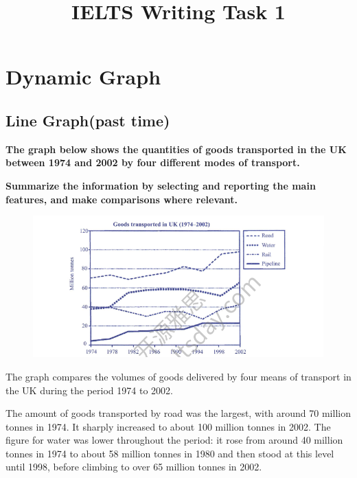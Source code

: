 \documentclass[conference]{IEEEtran}
\begin{document}
\title{IELTS Writing Task 1\\}

\author{}

\maketitle

\section{Dynamic Graph}

\subsection{Line Graph(past time)}

\textbf{The graph below shows the quantities of goods transported in the UK between 1974 and 2002 by four different modes of transport.}

\textbf{Summarize the information by selecting and reporting the main features, and make comparisons where relevant.}

\begin{figure}[htbp]
    \centerline{\includegraphics[width=1.4\columnwidth]{images/Screenshot from 2022-12-03 15-25-38.png}}
\end{figure}

The graph compares the volumes of goods delivered by four means of transport in the UK during the period 1974 to 2002.

The amount of goods transported by road was the largest, with around 70 million tonnes in 1974. 
It sharply increased to about 100 million tonnes in 2002. 
The figure for water was lower throughout the period: 
it rose from around 40 million tonnes in 1974 to about 58 million tonnes in 1980 and then stood at this level until 1998, 
before climbing to over 65 million tonnes in 2002.
\end{document}
